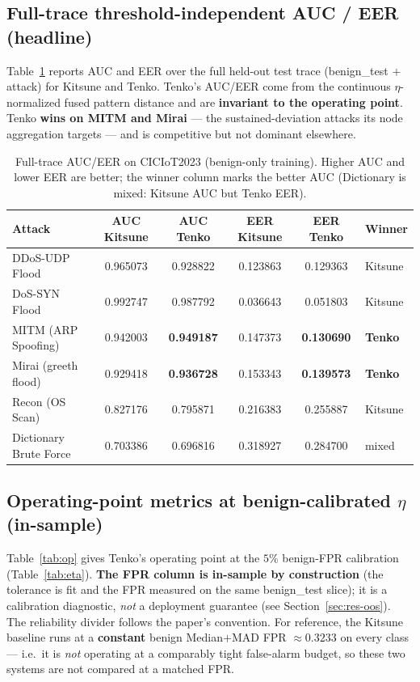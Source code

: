 \documentclass[11pt]{article}
\begin{document}
\subsection{Full-trace threshold-independent AUC / EER (headline)}
\label{sec:res-auc}

Table~\ref{tab:auc} reports AUC and EER over the full held-out test trace
(benign\_test $+$ attack) for Kitsune and Tenko. Tenko's AUC/EER come from the continuous
$\eta$-normalized fused pattern distance and are \textbf{invariant to the operating point}. Tenko
\textbf{wins on MITM and Mirai} --- the sustained-deviation attacks its node aggregation targets ---
and is competitive but not dominant elsewhere.

\begin{table}[t]
\centering
\caption{Full-trace AUC/EER on CICIoT2023 (benign-only training). Higher AUC and lower EER are better;
the winner column marks the better AUC (Dictionary is mixed: Kitsune AUC but Tenko EER).}
\label{tab:auc}
\small
\begin{tabular}{lccccl}
\toprule
\textbf{Attack} & \textbf{AUC Kitsune} & \textbf{AUC Tenko} & \textbf{EER Kitsune} & \textbf{EER Tenko} & \textbf{Winner} \\
\midrule
DDoS-UDP Flood         & 0.965073 & 0.928822 & 0.123863 & 0.129363 & Kitsune \\
DoS-SYN Flood          & 0.992747 & 0.987792 & 0.036643 & 0.051803 & Kitsune \\
MITM (ARP Spoofing)    & 0.942003 & \textbf{0.949187} & 0.147373 & \textbf{0.130690} & \textbf{Tenko} \\
Mirai (greeth flood)   & 0.929418 & \textbf{0.936728} & 0.153343 & \textbf{0.139573} & \textbf{Tenko} \\
Recon (OS Scan)        & 0.827176 & 0.795871 & 0.216383 & 0.255887 & Kitsune \\
Dictionary Brute Force & 0.703386 & 0.696816 & 0.318927 & 0.284700 & mixed \\
\bottomrule
\end{tabular}
\end{table}

\subsection{Operating-point metrics at benign-calibrated $\eta$ (in-sample)}
\label{sec:res-op}

Table~\ref{tab:op} gives Tenko's operating point at the $5\%$ benign-FPR calibration
(Table~\ref{tab:eta}). \textbf{The FPR column is in-sample by construction} (the tolerance is fit and
the FPR measured on the same benign\_test slice); it is a calibration diagnostic, \emph{not} a
deployment guarantee (see Section~\ref{sec:res-oos}). The reliability divider follows the paper's
convention. For reference, the Kitsune baseline runs at a \textbf{constant} benign Median$+$MAD
FPR $\approx 0.3233$ on every class --- i.e.\ it is \emph{not} operating at a comparably tight
false-alarm budget, so these two systems are not compared at a matched FPR.
\end{document}
